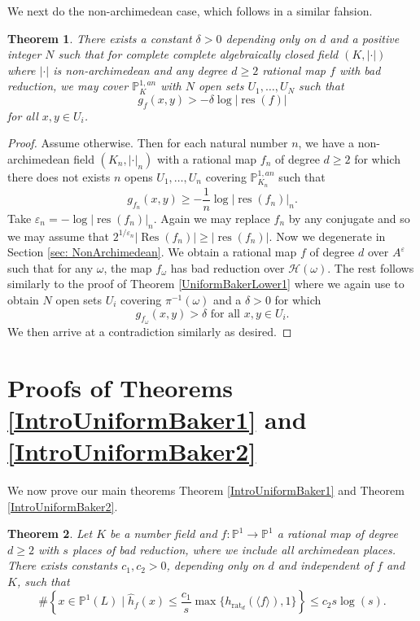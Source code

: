 \documentclass[10pt]{amsart}
\newcommand{\bb}{\mathbb}
\newcommand{\Res}{\operatorname{Res}}
\newcommand{\res}{\operatorname{res}}
\newcommand{\berkP}{\mathbb{P}^{1,an}}
\newcommand{\cal}{\mathcal}
\newcommand{\eps}{\varepsilon}
\newcommand{\h}{\widehat{h}}
\newcommand{\rat}{\operatorname{rat}}
\newtheorem{theorem}{Theorem}
\numberwithin{theorem}{section}
\numberwithin{example}{section}
\numberwithin{definition}{section}
\begin{document}
We next do the non-archimedean case, which follows in a similar fahsion.

\begin{theorem} \label{UniformBakerLower2}
There exists a constant $\delta > 0$ depending only on $d$ and a positive integer $N$ such that for complete complete algebraically closed field $(K, | \cdot |)$ where $| \cdot |$ is non-archimedean and any degree $d \geq 2$ rational map $f$ with bad reduction, we may cover $\berkP_K$ with $N$ open sets $U_1,\ldots,U_N$ such that 
$$g_f(x,y) > -\delta \log |\res(f)|$$
for all $x,y \in U_i$. 
\end{theorem}

\begin{proof}
Assume otherwise. Then for each natural number $n$, we have a non-archimedean field $(K_n, | \cdot |_n)$ with a rational map $f_n$ of degree $d \geq 2$ for which there does not exists $n$ opens $U_1,\ldots,U_n$ covering $\berkP_{K_n}$ such that 
$$g_{f_n}(x,y) \geq -\frac{1}{n} \log |\res(f_n)|_n.$$
Take $\eps_n = -\log|\res(f_n)|_n$. Again we may replace $f_n$ by any conjugate and so we may assume that $2^{1/\eps_n} |\Res(f_n)| \geq |\res(f_n)|$. Now we degenerate in Section \ref{sec: NonArchimedean}. We obtain a rational map $f$ of degree $d$ over $A^{\eps}$ such that for any $\omega$, the map $f_{\omega}$ has bad reduction over $\cal{H}(\omega)$. The rest follows similarly to the proof of Theorem \ref{UniformBakerLower1} where we again use \cite[Theorem 3.14]{Bak09} to obtain $N$ open sets $U_i$ covering $\pi^{-1}(\omega)$ and a $\delta > 0$ for which 
$$g_{f_{\omega}}(x,y) > \delta \text{ for all } x,y \in U_i.$$
We then arrive at a contradiction similarly as desired. 
\end{proof}


\section{Proofs of Theorems \ref{IntroUniformBaker1} and \ref{IntroUniformBaker2}}
We now prove our main theorems Theorem \ref{IntroUniformBaker1} and Theorem \ref{IntroUniformBaker2}. 

\begin{theorem} \label{UniformBakerTheorem1}
Let $K$ be a number field and $f: \bb{P}^1 \to \bb{P}^1$ a rational map of degree $d \geq 2$ with $s$ places of bad reduction, where we include all archimedean places. There exists constants $c_1,c_2 > 0$, depending only on $d$ and independent of $f$ and $K$, such that 
$$
\# \left\{ x \in \bb{P}^1(L) \mid \h_f(x) \leq \frac{c_1}{s} \max\{h_{\rat_d}(\langle f \rangle) ,1\}\right\} \leq c_2 s \log(s).
$$
\end{theorem}
\end{document}
